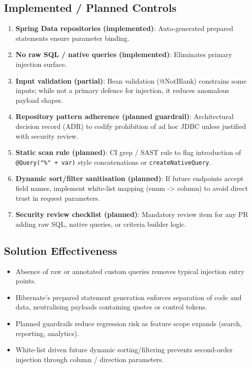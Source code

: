 \documentclass[]{UCD_CS_FYP_Report}
\begin{document}
\subsection*{Implemented / Planned Controls}
\begin{enumerate}
 \item \textbf{Spring Data repositories (implemented)}: Auto-generated prepared statements ensure parameter binding.
 \item \textbf{No raw SQL / native queries (implemented)}: Eliminates primary injection surface.
 \item \textbf{Input validation (partial)}: Bean validation (@NotBlank) constrains some inputs; while not a primary defence for injection, it reduces anomalous payload shapes.
 \item \textbf{Repository pattern adherence (planned guardrail)}: Architectural decision record (ADR) to codify prohibition of ad hoc JDBC unless justified with security review.
 \item \textbf{Static scan rule (planned)}: CI grep / SAST rule to flag introduction of \texttt{@Query("\%" + var)} style concatenations or \texttt{createNativeQuery}.
 \item \textbf{Dynamic sort/filter sanitisation (planned)}: If future endpoints accept field names, implement white-list mapping (enum -> column) to avoid direct trust in request parameters.
 \item \textbf{Security review checklist (planned)}: Mandatory review item for any PR adding raw SQL, native queries, or criteria builder logic.
\end{enumerate}


\subsection*{Solution Effectiveness}
\begin{itemize}
 \item Absence of raw or annotated custom queries removes typical injection entry points.
 \item Hibernate's prepared statement generation enforces separation of code and data, neutralising payloads containing quotes or control tokens.
 \item Planned guardrails reduce regression risk as feature scope expands (search, reporting, analytics).
 \item White-list driven future dynamic sorting/filtering prevents second-order injection through column / direction parameters.
\end{itemize}
\end{document}
